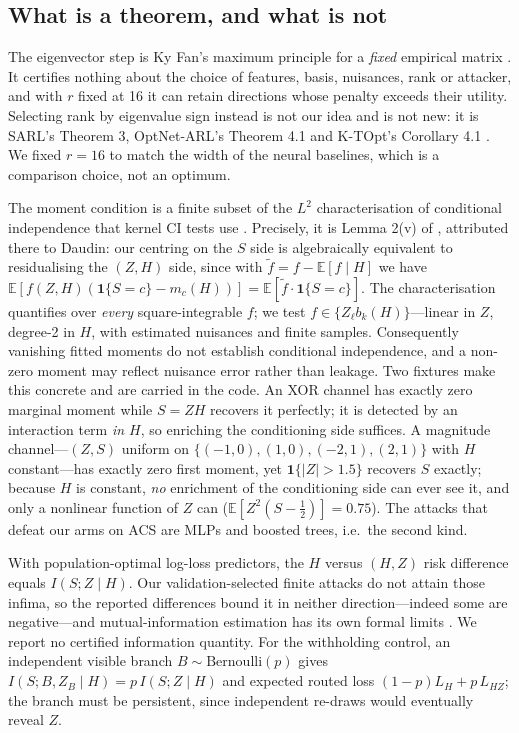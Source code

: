 \documentclass[10pt]{article}
\begin{document}
\subsection{What is a theorem, and what is not}
\label{sec:scope}

The eigenvector step is Ky Fan's maximum principle for a \emph{fixed} empirical matrix
\citep{fan1949weyl}. It certifies nothing about the choice of features, basis, nuisances, rank or
attacker, and with $r$ fixed at 16 it can retain directions whose penalty exceeds their utility.
Selecting rank by eigenvalue sign instead is not our idea and is not new: it is SARL's Theorem 3,
OptNet-ARL's Theorem 4.1 and K-TOpt's Corollary 4.1
\citep{sadeghi2019sarl,sadeghi2021optnetarl,sadeghi2022ktopt}. We fixed $r=16$ to match the width of
the neural baselines, which is a comparison choice, not an optimum.

The moment condition is a finite subset of the $L^2$ characterisation of conditional independence
that kernel CI tests use \citep{zhang2011kci,strobl2019rcit}. Precisely, it is Lemma 2(v) of
\citet{zhang2011kci}, attributed there to Daudin: our centring on the $S$ side is algebraically
equivalent to residualising the $(Z,H)$ side, since with $\tilde f=f-\mathbb{E}[f\mid H]$ we have
$\mathbb{E}[f(Z,H)(\mathbf 1\{S=c\}-m_c(H))]=\mathbb{E}[\tilde f\cdot\mathbf 1\{S=c\}]$. The
characterisation quantifies over \emph{every} square-integrable $f$; we test
$f\in\{Z_\ell b_k(H)\}$---linear in $Z$, degree-2 in $H$, with estimated nuisances and finite
samples. Consequently vanishing fitted moments do not establish conditional independence, and a
non-zero moment may reflect nuisance error rather than leakage. Two fixtures make this concrete and
are carried in the code. An XOR channel has exactly zero marginal moment while $S=ZH$ recovers it
perfectly; it is detected by an interaction term \emph{in $H$}, so enriching the conditioning side
suffices. A magnitude channel---$(Z,S)$ uniform on $\{(-1,0),(1,0),(-2,1),(2,1)\}$ with $H$
constant---has exactly zero first moment, yet $\mathbf 1\{|Z|>1.5\}$ recovers $S$ exactly; because
$H$ is constant, \emph{no} enrichment of the conditioning side can ever see it, and only a nonlinear
function of $Z$ can ($\mathbb{E}[Z^2(S-\tfrac12)]=0.75$). The attacks that defeat our arms on ACS are
MLPs and boosted trees, i.e.\ the second kind.

With population-optimal log-loss predictors, the $H$ versus $(H,Z)$ risk difference equals
$I(S;Z\mid H)$. Our validation-selected finite attacks do not attain those infima, so the reported
differences bound it in neither direction---indeed some are negative---and mutual-information
estimation has its own formal limits \citep{mcallester2020formal}. We report no certified
information quantity. For the withholding control, an independent visible branch
$B\sim\mathrm{Bernoulli}(p)$ gives $I(S;B,Z_B\mid H)=p\,I(S;Z\mid H)$ and expected routed loss
$(1-p)L_H+p\,L_{HZ}$; the branch must be persistent, since independent re-draws would eventually
reveal $Z$.
\end{document}
